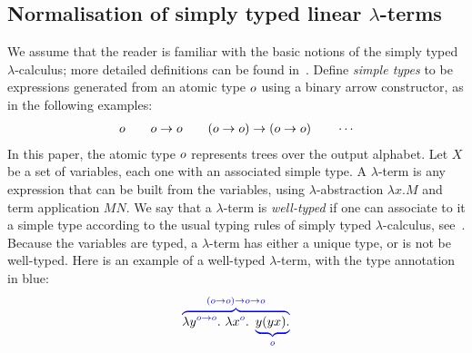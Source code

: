 \subsection{Normalisation of simply typed linear $\lambda$-terms}
\label{sec:one-register}




We assume that the reader is familiar with the basic notions of the simply typed $\lambda$-calculus; more detailed definitions can be found in~\cite{sorensen_lectures_2006}. 
Define  \emph{simple types} to be expressions  generated from an atomic type $o$ using a binary arrow constructor, as in the following examples:
\begin{align*}
    o \qquad o \to o \qquad (o \to o) \to (o \to o) \qquad \cdots 
\end{align*}
In this paper,  the atomic type $o$ represents trees over the output alphabet.
Let $X$ be a set of variables, each one with an associated simple type.  A $\lambda$-term  is any expression that can be built from the variables, using $\lambda$-abstraction $\lambda x. M$ and term application $M N$. 
We say that a $\lambda$-term is \emph{well-typed} if one can associate  to it  a simple type according to the usual typing rules of simply typed $\lambda$-calculus,
see~\cite[Definition 3.2.1]{sorensen_lectures_2006}. Because the variables are typed, a  $\lambda$-term has  either a unique type, or is not be well-typed.  Here is an example of a well-typed $\lambda$-term, with the type annotation in blue: 
\begin{align*}
    {\color{blue}\overbrace{
        {\color{black}\lambda {y}^{{\color{blue}o\to o}}. \ \lambda {x}^{{\color{blue}o}}.}  \ \underbrace{{\color{black}y (y x).}}_{o}}^{(o\to o) \to o\to o}}
    \end{align*}

    
